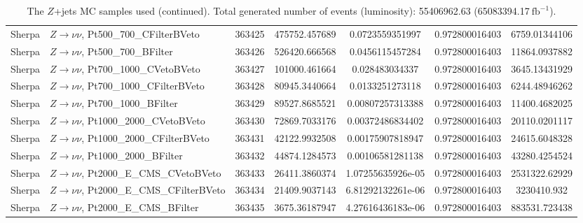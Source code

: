 \begin{table}[h]
\begin{center}
\begin{tabular}{|l|l|c|
S[table-parse-only, round-precision=4]|
S[table-parse-only, round-precision=3]|
S[table-parse-only, round-precision=3]|
S[table-parse-only, round-precision=3]|
}
Sherpa & $Z\rightarrow\nu\nu$, Pt500\_700\_CFilterBVeto & 363425 & 475752.457689 & 0.0723559351997 & 0.972800016403 & 6759.01344106 \\
Sherpa & $Z\rightarrow\nu\nu$, Pt500\_700\_BFilter & 363426 & 526420.666568 & 0.0456115457284 & 0.972800016403 & 11864.0937882 \\
Sherpa & $Z\rightarrow\nu\nu$, Pt700\_1000\_CVetoBVeto & 363427 & 101000.461664 & 0.028483034337 & 0.972800016403 & 3645.13431929 \\
Sherpa & $Z\rightarrow\nu\nu$, Pt700\_1000\_CFilterBVeto & 363428 & 80945.3440664 & 0.0133251273118 & 0.972800016403 & 6244.48946262 \\
Sherpa & $Z\rightarrow\nu\nu$, Pt700\_1000\_BFilter & 363429 & 89527.8685521 & 0.00807257313388 & 0.972800016403 & 11400.4682025 \\
Sherpa & $Z\rightarrow\nu\nu$, Pt1000\_2000\_CVetoBVeto & 363430 & 72869.7033176 & 0.00372486834402 & 0.972800016403 & 20110.0201117 \\
Sherpa & $Z\rightarrow\nu\nu$, Pt1000\_2000\_CFilterBVeto & 363431 & 42122.9932508 & 0.00175907818947 & 0.972800016403 & 24615.6048328 \\
Sherpa & $Z\rightarrow\nu\nu$, Pt1000\_2000\_BFilter & 363432 & 44874.1284573 & 0.00106581281138 & 0.972800016403 & 43280.4254524 \\
Sherpa & $Z\rightarrow\nu\nu$, Pt2000\_E\_CMS\_CVetoBVeto & 363433 & 26411.3860374 & 1.07255635926e-05 & 0.972800016403 & 2531322.62929 \\
Sherpa & $Z\rightarrow\nu\nu$, Pt2000\_E\_CMS\_CFilterBVeto & 363434 & 21409.9037143 & 6.81292132261e-06 & 0.972800016403 & 3230410.932 \\
Sherpa & $Z\rightarrow\nu\nu$, Pt2000\_E\_CMS\_BFilter & 363435 & 3675.36187947 & 4.27616436183e-06 & 0.972800016403 & 883531.723438 \\
\bottomrule
\end{tabular}
\caption{The $Z$+jets MC samples used (continued). Total generated number of events (luminosity): 55406962.63 (65083394.17$~\mathrm{fb}^{-1}$).}
\label{tab:app:datamcZ_sherpa_220}
\end{center}
\end{table}
